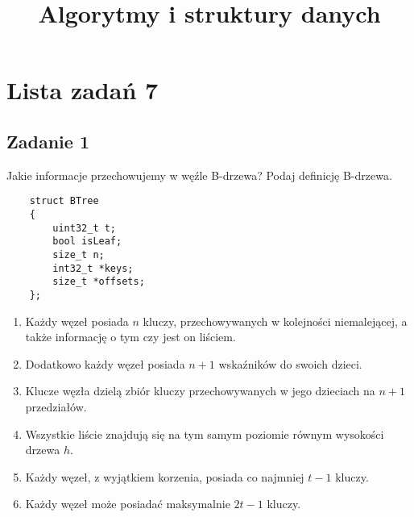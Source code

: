 \documentclass{article}
\begin{document}
\title{Algorytmy i struktury danych}
\author{}
\date{}
\maketitle

\section*{Lista zadań 7}

\subsection*{Zadanie 1}
Jakie informacje przechowujemy w węźle B-drzewa? Podaj definicję B-drzewa.
\begin{lstlisting}
    struct BTree
    {
        uint32_t t;
        bool isLeaf;
        size_t n;
        int32_t *keys;
        size_t *offsets;
    };
\end{lstlisting}
\begin{enumerate}
    \item Każdy węzeł posiada $n$ kluczy, przechowywanych w kolejności niemalejącej, a także informację o tym czy jest
          on liściem.
    \item Dodatkowo każdy węzeł posiada $n+1$ wskaźników do swoich dzieci.
    \item Klucze węzła dzielą zbiór kluczy przechowywanych w jego dzieciach na $n+1$ przedziałów.
    \item Wszystkie liście znajdują się na tym samym poziomie równym wysokości drzewa $h$.
    \item Każdy węzeł, z wyjątkiem korzenia, posiada co najmniej $t-1$ kluczy.
    \item Każdy węzeł może posiadać maksymalnie $2t-1$ kluczy.
\end{enumerate}
\end{document}
